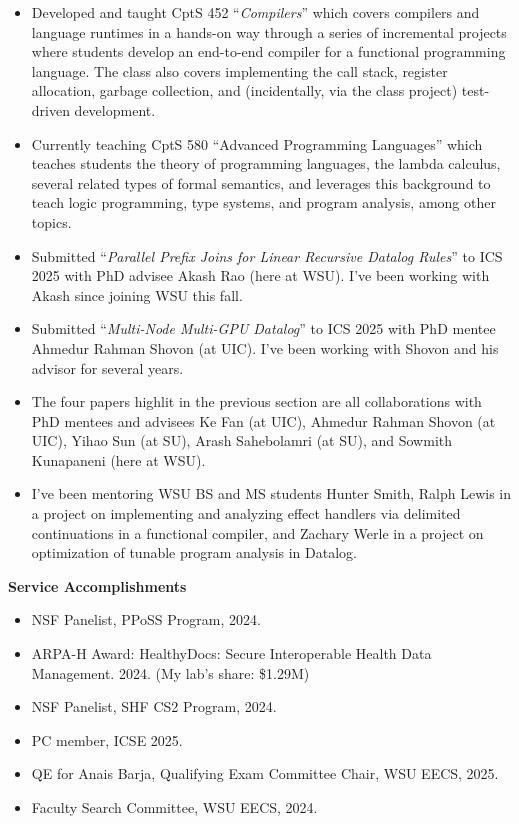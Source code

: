 \documentclass[line]{res}
\begin{document}
\begin{itemize}
  \item Developed and taught CptS 452 ``\emph{Compilers}'' which covers compilers and language runtimes in a hands-on way through a series of incremental projects where students develop an end-to-end compiler for a functional programming language. The class also covers implementing the call stack, register allocation, garbage collection, and (incidentally, via the class project) test-driven development.
  \item Currently teaching CptS 580 ``Advanced Programming Languages'' which teaches students the theory of programming languages, the lambda calculus, several related types of formal semantics, and leverages this background to teach logic programming, type systems, and program analysis, among other topics.
  \item Submitted ``\emph{Parallel Prefix Joins for Linear Recursive Datalog Rules}'' to ICS 2025 with PhD advisee Akash Rao (here at WSU). I've been working with Akash since joining WSU this fall.
  \item Submitted ``\emph{Multi-Node Multi-GPU Datalog}'' to ICS 2025 with PhD mentee Ahmedur Rahman Shovon (at UIC). I've been working with Shovon and his advisor for several years.
  \item The four papers highlit in the previous section are all collaborations with PhD mentees and advisees Ke Fan (at UIC), Ahmedur Rahman Shovon (at UIC), Yihao Sun (at SU), Arash Sahebolamri (at SU), and Sowmith Kunapaneni (here at WSU).
  \item I've been mentoring WSU BS and MS students Hunter Smith, Ralph Lewis in a project on implementing and analyzing effect handlers via delimited continuations in a functional compiler, and Zachary Werle in a project on optimization of tunable program analysis in Datalog.
\end{itemize}

\textbf{Service Accomplishments}

\begin{itemize}
    \item NSF Panelist, PPoSS Program, 2024.
    \item ARPA-H Award: HealthyDocs: Secure Interoperable Health Data Management. 2024. (My lab's share: \$1.29M)
    \item NSF Panelist, SHF CS2 Program, 2024.
    \item PC member, ICSE 2025.
    \item QE for Anais Barja, Qualifying Exam Committee Chair, WSU EECS, 2025.
    \item Faculty Search Committee, WSU EECS, 2024.
\end{itemize}
\end{document}
